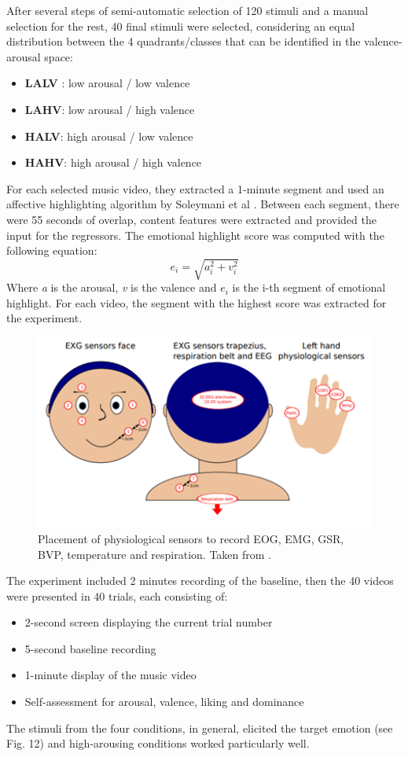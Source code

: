 After several steps of semi-automatic selection of 120 stimuli and a manual selection for the rest, 40 final stimuli were selected, considering an equal distribution between the 4 quadrants/classes that can be identified in the valence-arousal space:
\begin{itemize}
\item 	\textbf{LALV} : low arousal / low valence
\item 	\textbf{LAHV}: low arousal / high valence
\item  	\textbf{HALV}: high arousal / low valence
\item     \textbf{HAHV}: high arousal / high valence
\end{itemize}


For each selected music video, they extracted a 1-minute segment and used an affective highlighting algorithm by Soleymani et al \cite{soleymani_bayesian_2009}. Between each segment, there were 55 seconds of overlap, content features were extracted and provided the input for the regressors. The emotional highlight score was computed with the following equation: 
\[ e_i= \sqrt{a_i^2 + v_i^2} \]
Where \emph{a} is the arousal, \emph{v} is the valence and \(e_i\) is the i-th  segment of emotional highlight. For each video, the segment with the highest score was extracted for the experiment.

\begin{figure}[h!]
\includegraphics[width=12cm]{img/related_work/koelstra_sensors.png}
\centering
\caption{Placement of physiological sensors to record EOG, EMG, GSR, BVP, temperature and respiration. Taken from \cite{koelstra_deap_2012}.}\label{fig_koelstra_sensors}
\end{figure}

The experiment included 2 minutes recording of the baseline, then the 40 videos were presented in 40 trials, each consisting of:
\begin{itemize}
\item 2-second screen displaying the current trial number
\item 5-second baseline recording
\item 1-minute display of the music video
\item Self-assessment for arousal, valence, liking and dominance
\end{itemize}
The stimuli from the four conditions, in general, elicited the target emotion (see Fig. 12) and high-arousing conditions worked particularly well.

